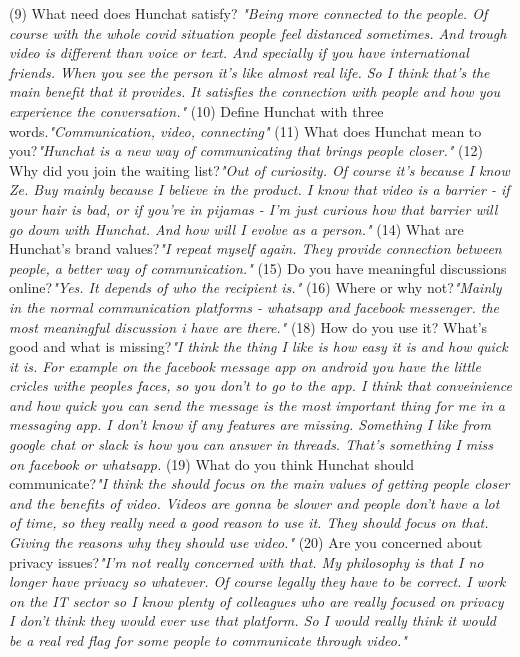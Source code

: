 \documentclass[12pt]{article}
\begin{document}
(9) What need does Hunchat satisfy? \textit{"Being more connected to the people. Of course with the whole covid situation people feel distanced sometimes. And trough video is different than voice or text. And specially if you have international friends. When you see the person it's like almost real life. So I think that's the main benefit that it provides. It satisfies the connection with people and how you experience the conversation."}
(10) Define Hunchat with three words.\textit{"Communication, video, connecting"}
(11) What does Hunchat mean to you?\textit{"Hunchat is a new way of communicating that brings people closer."}
(12) Why did you join the waiting list?\textit{"Out of curiosity. Of course it's because I know Ze. Buy mainly because I believe in the product. I know that video is a barrier - if your hair is bad, or if you're in pijamas - I'm just curious how that barrier will go down with Hunchat. And how will I evolve as a person."}
 (14) What are Hunchat’s brand values?\textit{"I repeat myself again. They provide connection between people, a better way of communication."}
(15) Do you have meaningful discussions online?\textit{"Yes. It depends of who the recipient is."}
(16) Where or why not?\textit{"Mainly in the normal communication platforms - whatsapp and facebook messenger. the most meaningful discussion i have are there."}
(18) How do you use it? What’s good and what is missing?\textit{"I think the thing I like is how easy it is and how quick it is. For example on the facebook message app on android you have the little cricles withe peoples faces, so you don't to go to the app. I think that conveinience and how quick you can send the message is the most important thing for me in a messaging app. I don't know if any features are missing. Something I like from google chat or slack is how you can answer in threads. That's something I miss on facebook or whatsapp.}
(19) What do you think Hunchat should communicate?\textit{"I think the should focus on the main values of getting people closer and the benefits of video. Videos are gonna be slower and people don't have a lot of time, so they really need a good reason to use it. They should focus on that. Giving the reasons why they should use video."}
(20) Are you concerned about privacy issues?\textit{"I'm not really concerned with that. My philosophy is that I no longer have privacy so whatever. Of course legally they have to be correct. I work on the IT sector so I know plenty of colleagues who are really focused on privacy I don't think they would ever use that platform. So I would really think it would be a real red flag for some people to communicate through video."}
\end{document}
